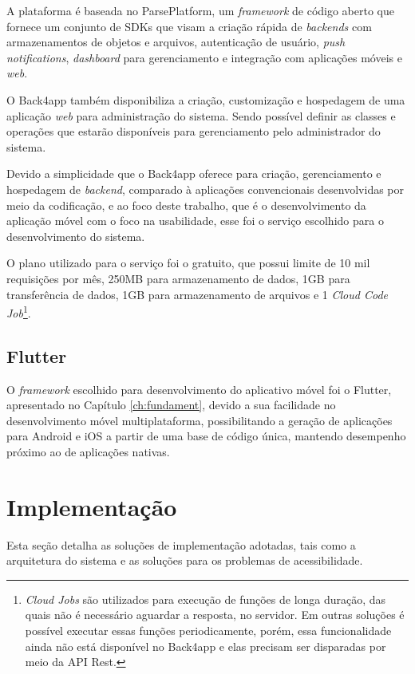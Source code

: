 A plataforma é baseada no ParsePlatform, um \emph{framework} de código aberto que fornece um conjunto de SDKs que visam a criação rápida de \emph{backends}
com armazenamentos de objetos e arquivos, autenticação de usuário, \emph{push notifications}, \emph{dashboard} para gerenciamento e integração com aplicações móveis e \emph{web}.

O Back4app também disponibiliza a criação, customização e hospedagem de uma aplicação \emph{web} para administração do sistema.
Sendo possível definir as classes e operações que estarão disponíveis para gerenciamento pelo administrador do sistema.

Devido a simplicidade que o Back4app oferece para criação, gerenciamento e hospedagem de \emph{backend}, comparado
à aplicações convencionais desenvolvidas por meio da codificação, e ao foco deste trabalho, que é o
desenvolvimento da aplicação móvel com o foco na usabilidade, esse foi o serviço escolhido para o desenvolvimento do sistema.

O plano utilizado para o serviço foi o gratuito, que possui limite de 10 mil requisições por mês, 250MB para armazenamento de dados,
1GB para transferência de dados, 1GB para armazenamento de arquivos e 1 \emph{Cloud Code Job}\footnote{\emph{Cloud Jobs} são utilizados
    para execução de funções de longa duração, das quais não é necessário aguardar a resposta, no servidor. Em outras soluções é possível
    executar essas funções periodicamente, porém, essa funcionalidade ainda não está disponível no Back4app e elas precisam ser disparadas
    por meio da API Rest.}.

\subsection{Flutter}

O \emph{framework} escolhido para desenvolvimento do aplicativo móvel foi o Flutter, apresentado no Capítulo \ref{ch:fundament},
devido a sua facilidade no desenvolvimento móvel multiplataforma, possibilitando a geração de aplicações
para Android e iOS a partir de uma base de código única, mantendo desempenho próximo ao de aplicações nativas.

\section{Implementação}

Esta seção detalha as soluções de implementação adotadas, tais como a arquitetura do sistema e as soluções
para os problemas de acessibilidade.

